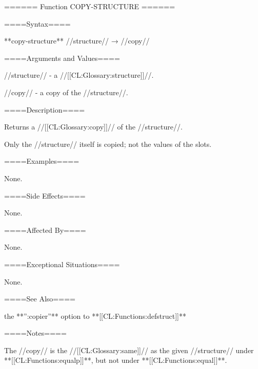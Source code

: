 ====== Function COPY-STRUCTURE ======

====Syntax====

**copy-structure** //structure// → //copy//

====Arguments and Values====

//structure// - a //[[CL:Glossary:structure]]//.

//copy// - a copy of the //structure//.

====Description====

Returns a //[[CL:Glossary:copy]]// of the //structure//.

Only the //structure// itself is copied; not the values of the slots.

====Examples====

None.

====Side Effects====

None.

====Affected By====

None.

====Exceptional Situations====

None.

====See Also====

the **'':copier''** option to **[[CL:Functions:defstruct]]**

====Notes====

The //copy// is the //[[CL:Glossary:same]]// as the given //structure// under **[[CL:Functions:equalp]]**, but not under **[[CL:Functions:equal]]**.


